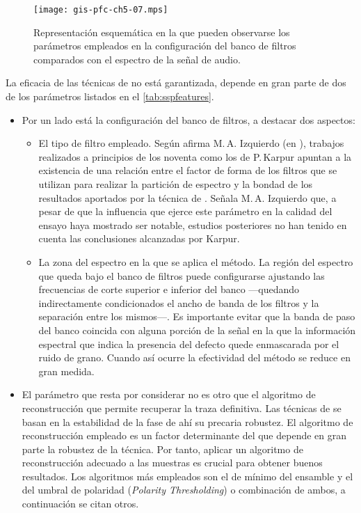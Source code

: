 \begin{figure}
	\begin{center}
		\texttt{[image: gis-pfc-ch5-07.mps]}
	\end{center}
	\caption[Parámetros de configuración del banco de filtros]{Representación esquemática en la que pueden observarse los parámetros empleados en la configuración del banco de filtros comparados con el espectro de la señal de audio.}
	\label{fig:filter}
\end{figure}

La eficacia de las técnicas de  no está garantizada, depende en gran parte de dos de los parámetros listados en el \cref{tab:sspfeatures}.

\begin{itemize}
	\item Por un lado está la configuración del banco de filtros, a destacar dos aspectos:
		\begin{itemize}
			\item El tipo de filtro empleado. Según afirma M.\,A. Izquierdo (en \cite{garcia2000mrsr}), trabajos realizados a principios de los noventa como los de P.\,Karpur apuntan a la existencia de una relación entre el factor de forma de los filtros que se utilizan para realizar la partición de espectro y la bondad de los resultados aportados por la técnica de . Señala M.\,A. Izquierdo que, a pesar de que la influencia que ejerce este parámetro en la calidad del ensayo haya mostrado ser notable, estudios posteriores no han tenido en cuenta las conclusiones alcanzadas por Karpur.
			\item La zona del espectro en la que se aplica el método. La región del espectro que queda bajo el banco de filtros puede configurarse ajustando las frecuencias de corte superior e inferior del banco ---quedando indirectamente condicionados el ancho de banda de los filtros y la separación entre los mismos---. Es importante evitar que la banda de paso del banco coincida con alguna porción de la señal en la que la información espectral que indica la presencia del defecto quede enmascarada por el ruido de grano. Cuando así ocurre la efectividad del método se reduce en gran medida.
		\end{itemize}
	\item El parámetro que resta por considerar no es otro que el algoritmo de reconstrucción que permite recuperar la traza definitiva. Las técnicas de  se basan en la estabilidad de la fase de ahí su precaria robustez. El algoritmo de reconstrucción empleado es un factor determinante del que depende en gran parte la robustez de la técnica. Por tanto, aplicar un algoritmo de reconstrucción adecuado a las muestras es crucial para obtener buenos resultados. Los algoritmos más empleados son el de mínimo del ensamble y el del umbral de polaridad (\emph{Polarity Thresholding}) o combinación de ambos, a continuación se citan otros.
\end{itemize}

